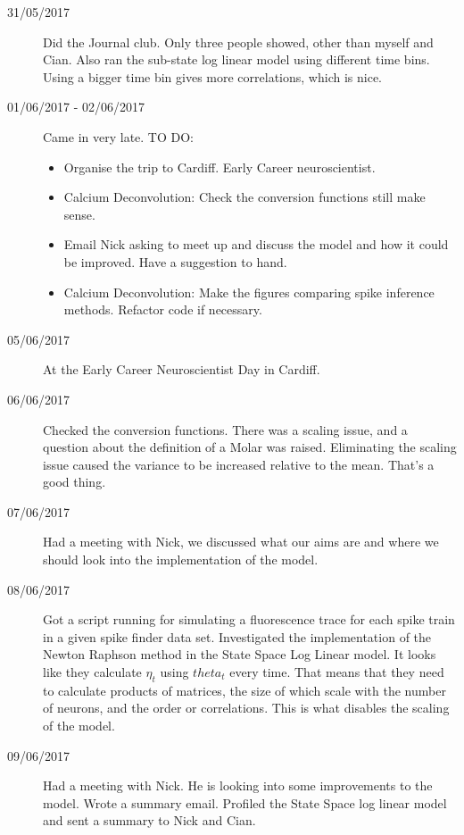 \documentclass[a4paper,12pt]{article}
\theoremstyle{definition}
\begin{document}
\begin{description}
	\item[31/05/2017] Did the Journal club. Only three people showed, other than myself and Cian. Also ran the sub-state log linear model using different time bins. Using a bigger time bin gives more correlations, which is nice.

	\item[01/06/2017 - 02/06/2017] Came in very late. TO DO:
	\begin{itemize}
		\item Organise the trip to Cardiff. Early Career neuroscientist.
		\item Calcium Deconvolution: Check the conversion functions still make sense.
		\item Email Nick asking to meet up and discuss the model and how it could be improved. Have a suggestion to hand.
		\item Calcium Deconvolution: Make the figures comparing spike inference methods. Refactor code if necessary.
	\end{itemize}

	\item[05/06/2017] At the Early Career Neuroscientist Day in Cardiff.

	\item[06/06/2017] Checked the conversion functions. There was a scaling issue, and a question about the definition of a Molar was raised. Eliminating the scaling issue caused the variance to be increased relative to the mean. That's a good thing.

	\item[07/06/2017] Had a meeting with Nick, we discussed what our aims are and where we should look into the implementation of the model.

	\item[08/06/2017] Got a script running for simulating a fluorescence trace for each spike train in a given spike finder data set. Investigated the implementation of the Newton Raphson method in the State Space Log Linear model. It looks like they calculate $\eta_t$ using $theta_t$ every time. That means that they need to calculate products of matrices, the size of which scale with the number of neurons, and the order or correlations. This is what disables the scaling of the model.

	\item[09/06/2017] Had a meeting with Nick. He is looking into some improvements to the model. Wrote a summary email. Profiled the State Space log linear model and sent a summary to Nick and Cian.


\end{description}
\end{document}
